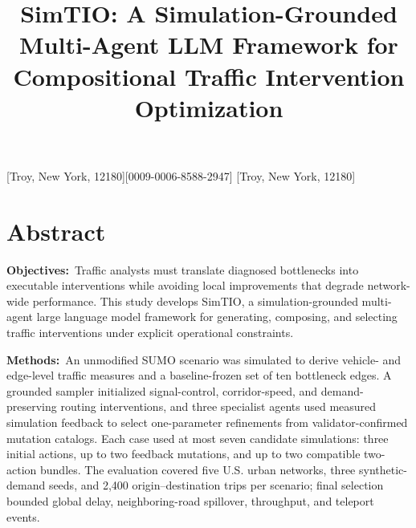 \documentclass{trbunofficial}
\begin{document}

\title{SimTIO: A Simulation-Grounded Multi-Agent LLM Framework for Compositional Traffic Intervention Optimization}

[Troy, New York, 12180][0009-0006-8588-2947]
[Troy, New York, 12180]




\maketitle

\section{Abstract}
\noindent\textbf{Objectives:}~Traffic analysts must translate diagnosed
bottlenecks into executable interventions while avoiding local improvements
that degrade network-wide performance. This study develops SimTIO, a
simulation-grounded multi-agent large language model framework for generating,
composing, and selecting traffic interventions under explicit operational
constraints.

\hfill\break%
\noindent\textbf{Methods:}~An unmodified SUMO scenario was simulated to derive
vehicle- and edge-level traffic measures and a baseline-frozen set of ten
bottleneck edges. A grounded sampler initialized signal-control,
corridor-speed, and demand-preserving routing interventions, and three
specialist agents used measured simulation feedback to select one-parameter
refinements from validator-confirmed mutation catalogs. Each case used at most
seven candidate simulations: three initial actions, up to two feedback
mutations, and up to two compatible two-action bundles. The evaluation covered
five U.S. urban networks, three synthetic-demand seeds, and 2,400
origin--destination trips per scenario; final selection bounded global delay,
neighboring-road spillover, throughput, and teleport events.
\end{document}
